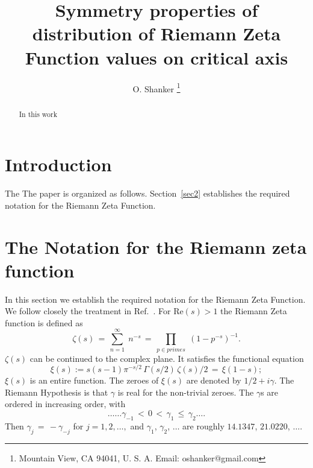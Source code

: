 \documentclass[twoside]{article}
\theoremstyle{definition}
\begin{document}
\date{}
\lhead[]{}
\chead[]{}
\rhead[]{}

\title{\bf{Symmetry properties of distribution of Riemann Zeta Function values on critical axis}}
%

\author{O. Shanker 
 \thanks{Mountain View, CA 94041, U. S. A. Email: oshanker@gmail.com
 }
}

\maketitle
\thispagestyle{fancy}

\begin{abstract}
In this work 
\end{abstract}



{}


\section{Introduction}
The The paper is organized as follows.
Section~\ref{sec2} establishes the required notation for the 
Riemann Zeta Function. 
\section{\label{sec2}The Notation for the Riemann zeta function }

In this section we  establish the required notation for the 
Riemann Zeta Function. We follow closely the treatment in Ref.~\cite{Shanker 2018}.
For $\mathrm{Re} (s) > 1$ the Riemann Zeta function is defined as
\begin{equation}
\zeta ( s ) \, = \, \sum^{\infty}_{n = 1} \; n^{-s} \, = \, \prod_{p \in primes} \;
\left( 1 - p^{-s} \right)^{-1}.
\label{eqRie}
\end{equation}
 $\zeta ( s )$ can be continued to
the complex plane. It satisfies the functional equation \cite{Riemann(1858),Riemann 1892, Titchmarsh 1986,Edwards(1974)}
\begin{equation}  
\xi(s):=s(s-1) \pi^{-s/2} \, \Gamma (s/2) \, \zeta ( s )/2 \, = \, \xi ( 1 - s );
\label{eq:xifunc}
\end{equation}
$\xi(s)$ is an entire function. The zeroes of $\xi(s)$ are denoted by $1/2 + i \gamma$. The Riemann Hypothesis  
is that $\gamma$ is real for the non-trivial zeroes.
The $\gamma$s are ordered in increasing order, with 
\begin{equation}
\ldots \ldots \gamma_{-1} \, < \, 0 \, < \, 
\gamma_1 \, \leq \, \gamma_2 \ldots. 
\end{equation}
Then $\gamma_j \, = \, - \gamma_{-j}$ for $j = 1, 2, \ldots,$ 
and    $\gamma_1$, $\gamma_2$, $\ldots$  are roughly
$14.1347$, $21.0220$, $\ldots$.
\end{document}
